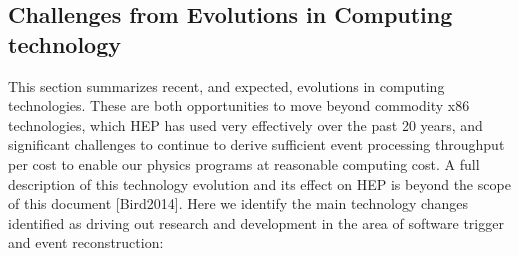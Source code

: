 \subsection{Challenges from Evolutions in Computing technology}

This section summarizes recent, and expected, evolutions in computing technologies. These are both opportunities to move beyond commodity x86 technologies, which HEP has used very effectively over the past 20 years, and significant challenges to continue to derive sufficient event processing throughput per cost to enable our physics programs at reasonable computing cost.  A full description of this technology evolution and its effect on HEP is beyond the scope of this document [Bird2014]. Here we identify the main technology changes identified as driving out research and development in the area of software trigger and event reconstruction:
